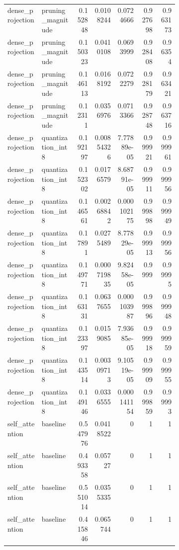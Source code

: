 \begin{landscape}
\begin{longtable}{@{}p{0.20\linewidth}p{0.20\linewidth}rrrrr@{}}
dense\_\allowbreak{}projection & pruning\_\allowbreak{}magnitude & 0.152848 & 0.0108244 & 0.0724666 & 0.927698 & 0.963173 \\
dense\_\allowbreak{}projection & pruning\_\allowbreak{}magnitude & 0.150323 & 0.0410108 & 0.0693999 & 0.928408 & 0.96354 \\
dense\_\allowbreak{}projection & pruning\_\allowbreak{}magnitude & 0.146113 & 0.0168192 & 0.0722279 & 0.928179 & 0.963421 \\
dense\_\allowbreak{}projection & pruning\_\allowbreak{}magnitude & 0.12311 & 0.0356976 & 0.0713366 & 0.928748 & 0.963716 \\
dense\_\allowbreak{}projection & quantization\_\allowbreak{}int8 & 0.192197 & 0.00854326 & 7.77889e-05 & 0.999921 & 0.999961 \\
dense\_\allowbreak{}projection & quantization\_\allowbreak{}int8 & 0.152302 & 0.0176579 & 8.68791e-05 & 0.999911 & 0.999956 \\
dense\_\allowbreak{}projection & quantization\_\allowbreak{}int8 & 0.146561 & 0.00268842 & 0.000102175 & 0.999898 & 0.999949 \\
dense\_\allowbreak{}projection & quantization\_\allowbreak{}int8 & 0.17891 & 0.0275489 & 8.77829e-05 & 0.999913 & 0.999956 \\
dense\_\allowbreak{}projection & quantization\_\allowbreak{}int8 & 0.149771 & 0.000719835 & 9.82458e-05 & 0.9999 & 0.99995 \\
dense\_\allowbreak{}projection & quantization\_\allowbreak{}int8 & 0.163131 & 0.0637655 & 0.000103987 & 0.999896 & 0.999948 \\
dense\_\allowbreak{}projection & quantization\_\allowbreak{}int8 & 0.123397 & 0.0159085 & 7.93685e-05 & 0.999918 & 0.999959 \\
dense\_\allowbreak{}projection & quantization\_\allowbreak{}int8 & 0.143514 & 0.00309713 & 9.10519e-05 & 0.999909 & 0.999955 \\
dense\_\allowbreak{}projection & quantization\_\allowbreak{}int8 & 0.149146 & 0.0336555 & 0.000141154 & 0.999859 & 0.99993 \\
self\_\allowbreak{}attention & baseline & 0.547976 & 0.0418522 & 0 & 1 & 1 \\
self\_\allowbreak{}attention & baseline & 0.493358 & 0.05727 & 0 & 1 & 1 \\
self\_\allowbreak{}attention & baseline & 0.551014 & 0.0355335 & 0 & 1 & 1 \\
self\_\allowbreak{}attention & baseline & 0.415846 & 0.065744 & 0 & 1 & 1 \\

\end{longtable}
\end{landscape}
